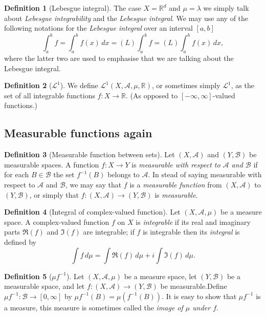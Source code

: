 \documentclass[12pt]{article}
\theoremstyle{definition}
\newtheorem{definition}{Definition}[section]
\newcommand{\real}{\mathbb{R}}   %
\newcommand{\algebra}{\mathscr{A}}
\renewcommand{\L}{\mathscr{L}}
\begin{document}
\begin{definition}[Lebesgue integral]
    The case $X=\real^d$ and $\mu=\lambda$ we simply talk about \textit{Lebesgue integrability} and the \textit{Lebesgue integral}. We may use any of the following notations for the \textit{Lebesgue integral} over an interval $[a,b]$
    \begin{equation*}
        \int_a^b f=\int_a^b f(x) \, dx=(L)\int_a^b f=(L)\int_a^b f(x) \, dx,
    \end{equation*}
    where the latter two are used to emphasise that we are talking about the Lebesgue integral.
\end{definition}
\begin{definition}[$\L^1$]
    We define $\L^1(X,\algebra,\mu,\real)$, or sometimes simply $\L^1$, as the set of all integrable functions $f:X\to \real$. (As opposed to $[-\infty,\infty]$-valued functions.)
\end{definition}
\subsection{Measurable functions again}
\begin{definition}[Measurable function between sets]
    Let $(X,\algebra)$ and $(Y,\mathscr{B})$ be measurable spaces. A function $f:X\to Y$ is \textit{measurable with respect to $\algebra$ and $\mathscr{B}$} if for each $B\in \mathscr{B}$ the set $f^{-1}(B)$ belongs to $\algebra$. In stead of saying measurable with respect to $\algebra$ and $\mathscr{B}$, we may say that $f$ is a \textit{measurable function} from $(X,\algebra)$ to $(Y,\mathscr{B})$, or simply that $f:(X,\algebra)\to (Y,\mathscr{B})$ is \textit{measurable}.
\end{definition}
\begin{definition}[Integral of complex-valued function]
    Let $(X,\algebra,\mu)$ be a measure space. A complex-valued function $f$ on $X$ is \textit{integrable} if its real and imaginary parts $\Re (f)$ and $\Im (f)$ are integrable; if $f$ is integrable then its \textit{integral} is defined by
    \begin{equation*}
        \int f \, d\mu = \int \Re(f) \, d\mu +i\int \Im(f) \, d\mu.
    \end{equation*}
\end{definition}
\begin{definition}[$\mu f^{-1}$]
    Let $(X,\algebra,\mu)$ be a measure space, let $(Y,\mathscr{B})$ be a measurable space, and let $f:(X,\algebra)\to(Y,\mathscr{B})$ be measurable.Define $\mu f^{-1}:\mathscr{B}\to [0,\infty]$ by $\mu f^{-1}(B)=\mu(f^{-1}(B))$. It is easy to show that $\mu f^{-1}$ is a measure, this measure is sometimes called the \textit{image of $\mu$ under $f$}.
\end{definition}
\newpage
\end{document}
